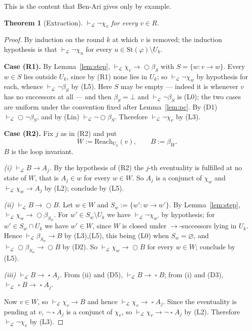 \documentclass[11pt,a4paper]{article}
\newtheorem{theorem}{Theorem}[section]
\theoremstyle{definition}
\newcommand{\Next}{\mathop{\bigcirc}}
\newcommand{\Always}{\mathop{\square}}
\newcommand{\St}{\mathrm{St}}
\newcommand{\proves}{\vdash_{\mathcal{L}}}
\newcommand{\Reach}{\mathrm{Reach}}
\begin{document}
This is the content that Ben-Ari gives only by example.

\begin{theorem}[Extraction]\label{thm:extract}
$\proves\neg\chi_v$ for every $v\in R$.
\end{theorem}

\begin{proof}
By induction on the round $k$ at which $v$ is removed; the induction hypothesis
is that $\proves\neg\chi_u$ for every $u\in\St(\varphi)\setminus U_k$.

\medskip\noindent\textbf{Case (R1).}
By Lemma~\ref{lem:step}, $\proves\chi_v\to\Next\beta_S$ with $S=\{w:v\to w\}$.
Every $w\in S$ lies outside $U_k$, since by (R1) none lies in $U_k$; so
$\proves\neg\chi_w$ by hypothesis for each, whence $\proves\neg\beta_S$ by (L5).
Here $S$ may be empty --- indeed it is whenever $v$ has no successors at all ---
and then $\beta_S=\bot$ and $\proves\neg\beta_S$ is (L0); the two cases are
uniform under the convention fixed after Lemma~\ref{lem:pc}.  By (D1)
$\proves\Next\neg\beta_S$, and by (Lin) $\proves\neg\Next\beta_S$.  Therefore
$\proves\neg\chi_v$ by (L3).

\medskip\noindent\textbf{Case (R2).}
Fix $j$ as in (R2) and put
\[
  W:=\Reach_{U_k}(v),\qquad B:=\beta_W .
\]
$B$ is the loop invariant.

\medskip
\emph{(i) $\proves B\to A_j$.}  By the hypothesis of (R2) the $j$-th eventuality
is fulfilled at no state of $W$, that is $A_j\in w$ for every $w\in W$.  So
$A_j$ is a conjunct of $\chi_w$ and $\proves\chi_w\to A_j$ by (L2); conclude by
(L5).

\medskip
\emph{(ii) $\proves B\to\Next B$.}  Let $w\in W$ and $S_w:=\{w':w\to w'\}$.  By
Lemma~\ref{lem:step}, $\proves\chi_w\to\Next\beta_{S_w}$.  For
$w'\in S_w\setminus U_k$ we have $\proves\neg\chi_{w'}$ by hypothesis; for
$w'\in S_w\cap U_k$ we have $w'\in W$, since $W$ is closed under
$\to$-successors lying in $U_k$.  Hence $\proves\beta_{S_w}\to B$ by (L3),(L5),
this being (L0) when $S_w=\varnothing$, and
$\proves\Next\beta_{S_w}\to\Next B$ by (D2).  So $\proves\chi_w\to\Next B$
for every $w\in W$; conclude by (L5).

\medskip
\emph{(iii) $\proves B\to\Always A_j$.}  From (ii) and (D5),
$\proves B\to\Always B$; from (i) and (D3), $\proves\Always B\to\Always A_j$.

\medskip
Now $v\in W$, so $\proves\chi_v\to B$ and hence $\proves\chi_v\to\Always A_j$.
Since the eventuality is pending at $v$, $\neg\Always A_j$ is a conjunct of
$\chi_v$, so $\proves\chi_v\to\neg\Always A_j$ by (L2).  Therefore
$\proves\neg\chi_v$ by (L3).
\end{proof}
\end{document}
